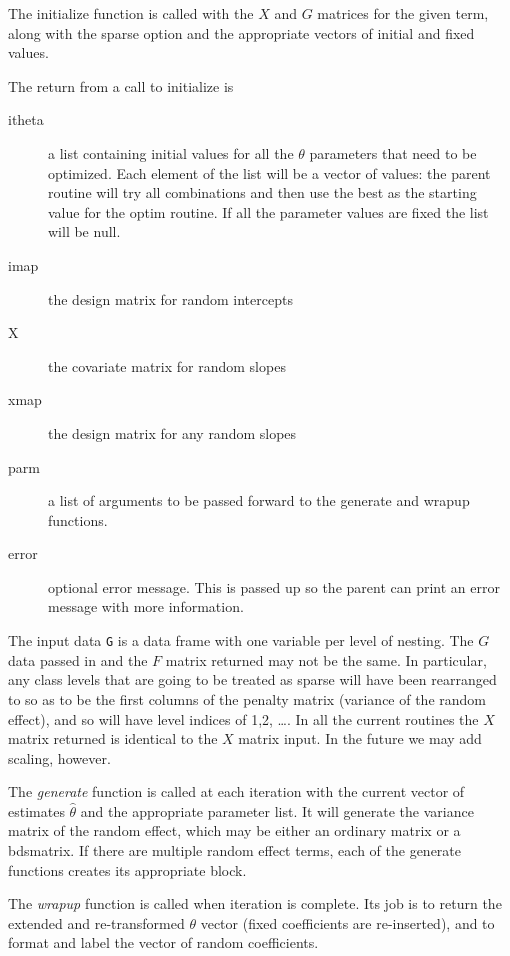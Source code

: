 \documentclass{article}
\begin{document}
The initialize function is called with the $X$ and $G$ matrices for the
given term, along with the sparse option and 
the appropriate vectors of initial and fixed values.

The return from a call to initialize is
\begin{description}
\item[itheta] a list containing initial values for all the $\theta$ parameters
  that need to be optimized.  Each element of the list will be a vector of
  values: the parent routine will try all combinations and then use the best as
  the starting value for the optim routine.  If all the parameter values are
  fixed the list will be null.
\item[imap] the design matrix for random intercepts
\item[X] the covariate matrix for random slopes
\item[xmap] the design matrix for any random slopes
\item[parm] a list of arguments to be passed forward to the 
generate and wrapup functions. 
\item[error] optional error message.  This is passed up so the parent
  can print an error message with more information.
\end{description}

The input data {\tt{}G} is a data frame with one variable per level of
nesting.  
The $G$ data passed in and the $F$ matrix returned may not be the same.
In particular, any class levels that are going to be treated as
sparse will have been rearranged to so as to be the first columns of
the penalty matrix (variance of the random effect), and so will have
level indices of 1,2, \ldots.
In all the current routines the $X$ matrix returned is
identical to the $X$ matrix input. In the future we may add scaling,
however.

The \emph{generate} function is called at each iteration with the current
vector of estimates $\hat\theta$ and the appropriate parameter list.  
It will generate
the variance matrix of the random effect, which   
may be either an ordinary matrix or a bdsmatrix.
If there are multiple random effect terms, each of the generate
functions creates its appropriate block.

The \emph{wrapup} function is called when iteration is complete.  Its
job is to return the extended and re-transformed $\theta$
vector (fixed coefficients are re-inserted), and to format and label 
the vector of random coefficients.
\end{document}
